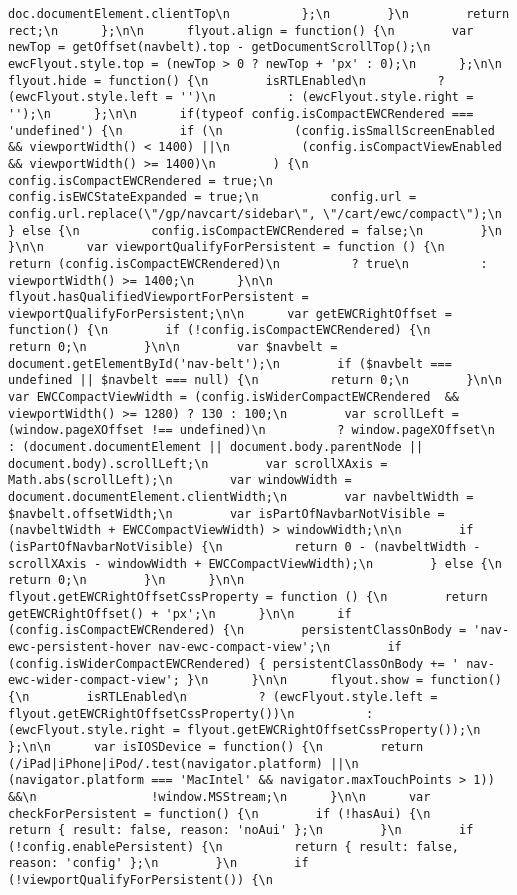 \documentclass[
]{article}
\begin{document}
\begin{verbatim}
doc.documentElement.clientTop\n          };\n        }\n        return rect;\n      };\n\n      flyout.align = function() {\n        var newTop = getOffset(navbelt).top - getDocumentScrollTop();\n        ewcFlyout.style.top = (newTop > 0 ? newTop + 'px' : 0);\n      };\n\n      flyout.hide = function() {\n        isRTLEnabled\n          ? (ewcFlyout.style.left = '')\n          : (ewcFlyout.style.right = '');\n      };\n\n      if(typeof config.isCompactEWCRendered === 'undefined') {\n        if (\n          (config.isSmallScreenEnabled && viewportWidth() < 1400) ||\n          (config.isCompactViewEnabled && viewportWidth() >= 1400)\n        ) {\n          config.isCompactEWCRendered = true;\n          config.isEWCStateExpanded = true;\n          config.url = config.url.replace(\"/gp/navcart/sidebar\", \"/cart/ewc/compact\");\n        } else {\n          config.isCompactEWCRendered = false;\n        }\n      }\n\n      var viewportQualifyForPersistent = function () {\n        return (config.isCompactEWCRendered)\n          ? true\n          : viewportWidth() >= 1400;\n      }\n\n      flyout.hasQualifiedViewportForPersistent = viewportQualifyForPersistent;\n\n      var getEWCRightOffset = function() {\n        if (!config.isCompactEWCRendered) {\n          return 0;\n        }\n\n        var $navbelt = document.getElementById('nav-belt');\n        if ($navbelt === undefined || $navbelt === null) {\n          return 0;\n        }\n\n        var EWCCompactViewWidth = (config.isWiderCompactEWCRendered  && viewportWidth() >= 1280) ? 130 : 100;\n        var scrollLeft = (window.pageXOffset !== undefined)\n          ? window.pageXOffset\n          : (document.documentElement || document.body.parentNode || document.body).scrollLeft;\n        var scrollXAxis = Math.abs(scrollLeft);\n        var windowWidth = document.documentElement.clientWidth;\n        var navbeltWidth = $navbelt.offsetWidth;\n        var isPartOfNavbarNotVisible = (navbeltWidth + EWCCompactViewWidth) > windowWidth;\n\n        if (isPartOfNavbarNotVisible) {\n          return 0 - (navbeltWidth - scrollXAxis - windowWidth + EWCCompactViewWidth);\n        } else {\n          return 0;\n        }\n      }\n\n      flyout.getEWCRightOffsetCssProperty = function () {\n        return getEWCRightOffset() + 'px';\n      }\n\n      if (config.isCompactEWCRendered) {\n        persistentClassOnBody = 'nav-ewc-persistent-hover nav-ewc-compact-view';\n        if (config.isWiderCompactEWCRendered) { persistentClassOnBody += ' nav-ewc-wider-compact-view'; }\n      }\n\n      flyout.show = function() {\n        isRTLEnabled\n          ? (ewcFlyout.style.left = flyout.getEWCRightOffsetCssProperty())\n          : (ewcFlyout.style.right = flyout.getEWCRightOffsetCssProperty());\n      };\n\n      var isIOSDevice = function() {\n        return (/iPad|iPhone|iPod/.test(navigator.platform) ||\n                (navigator.platform === 'MacIntel' && navigator.maxTouchPoints > 1)) &&\n                !window.MSStream;\n      }\n\n      var checkForPersistent = function() {\n        if (!hasAui) {\n          return { result: false, reason: 'noAui' };\n        }\n        if (!config.enablePersistent) {\n          return { result: false, reason: 'config' };\n        }\n        if (!viewportQualifyForPersistent()) {\n          
\end{verbatim}
\end{document}
